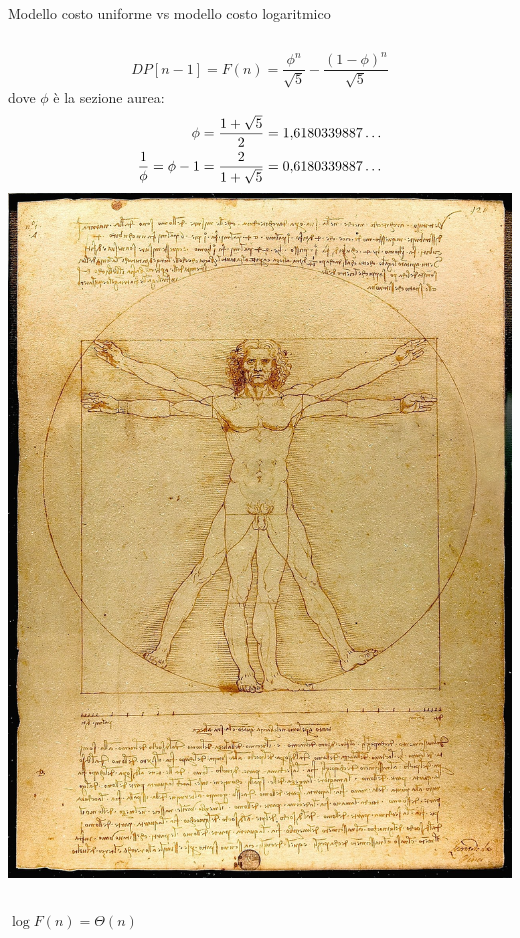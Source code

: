 \begin{frame}{Modello costo uniforme vs modello costo logaritmico}

\vspace{-9pt}
\begin{myboxtitle}
\vspace{6pt}
\begin{columns}[T]
\[
\mathit{DP}[n-1] = F(n) = \frac{\phi^n}{\sqrt{5}} - \frac{(1-\phi)^n}{\sqrt{5}} 
\]
dove $\phi$ è la \alert{sezione aurea}:
\begin{align*}
\phi &={1+\sqrt 5 \over 2}=1{,}6180339887\dots  \\
\frac{1}{\phi} = \phi - 1 & ={2 \over 1+\sqrt 5 }=0{,}6180339887\dots 
\end{align*}
\includegraphics[width=\textwidth]{vitruviano.jpg}
\end{columns}
\end{myboxtitle}


\begin{columns}[T]
\vspace{-6pt}
\pause
{}

\bigskip
\alert{$\log F(n) = \Theta(n)$}
\end{columns}

\end{frame}

